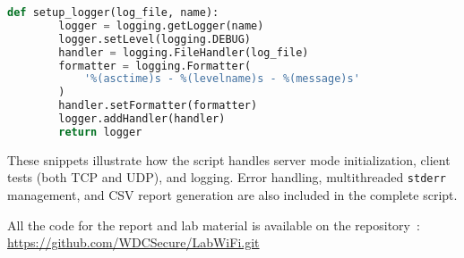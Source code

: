         \begin{lstlisting}[language=Python, caption={Excerpt for logging setup.}]
      def setup_logger(log_file, name):
        logger = logging.getLogger(name)
        logger.setLevel(logging.DEBUG)
        handler = logging.FileHandler(log_file)
        formatter = logging.Formatter(
            '%(asctime)s - %(levelname)s - %(message)s'
        )
        handler.setFormatter(formatter)
        logger.addHandler(handler)
        return logger
        \end{lstlisting}

    \noindent These snippets illustrate how the script handles server mode initialization, client tests (both TCP and UDP), and logging. 
    Error handling, multithreaded \texttt{stderr} management, and CSV report generation are also included in the complete script.
    
    \noindent All the code for the report and lab material is available on the repository~\cite{LabWiFiRepo}: \url{https://github.com/WDCSecure/LabWiFi.git}
